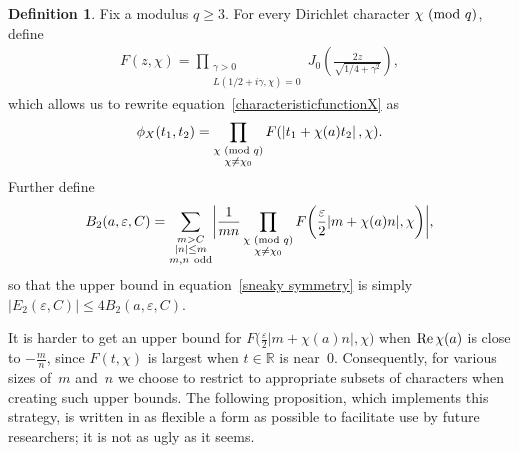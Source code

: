 \documentclass[11pt]{article}
\theoremstyle{plain}
\theoremstyle{definition}
\newtheorem{definition}[thm]{Definition}
\numberwithin{equation}{section}
\renewcommand{\mod}[1]{{\ifmmode\text{\rm\ (mod~$#1$)}\else\discretionary{}{}{\hbox{\!\!}}\rm(mod~$#1$)\fi}}
\renewcommand{\Re}{\mathop{\rm Re}}
\newcommand{\R}{\mathbb R}
\newcommand{\0}{{\vec 0}}
\begin{document}
\begin{definition}
Fix a modulus $q\ge3$. For every Dirichlet character $\chi\mod q$, define
\begin{align} \label{eq.def of Fzchi}
F(z,\chi) = \prod_{\substack{\gamma>0\\ L(1/2+i\gamma,\chi)=0}} J_0\left( \frac{2z}{\sqrt{1/4+\gamma^2}} \right),
\end{align}
which allows us to rewrite equation~\eqref{characteristicfunctionX} as
\begin{align} \label{eq:phiX with F}
\phi_X(t_1,t_2) = \prod_{\substack{\chi\mod{q}\\ \chi\neq\chi_0}} F(\left|t_1+\chi(a)t_2\right|,\chi).
\end{align}
Further define
\[
B_2(a,\varepsilon,C) = \sum_{\substack{m>C \\ |n| \le m \\ m,n\ \text{odd}}} \biggl| \frac1{mn} \prod_{\substack{\chi \mod{q}\\ \chi\neq \chi_0}} F\biggl( \frac{\varepsilon}{2} |m+\chi(a)n|,\chi \biggr) \biggr|,
\]
so that the upper bound in equation~\eqref{sneaky symmetry} is simply $\bigl| E_2(\varepsilon,C) \bigr| \le 4B_2(a,\varepsilon,C)$.
\end{definition}

It is harder to get an upper bound for $F\bigl( \frac{\varepsilon}{2} |m+\chi(a)n|,\chi \bigr)$ when $\Re\chi(a)$ is close to $-\frac mn$, since $F(t,\chi)$ is largest when $t\in\R$ is near~$0$. Consequently, for various sizes of~$m$ and~$n$ we choose to restrict to appropriate subsets of characters when creating such upper bounds.
The following proposition, which implements this strategy, is written in as flexible a form as possible to facilitate use by future researchers; it is not as ugly as it seems.
\end{document}
